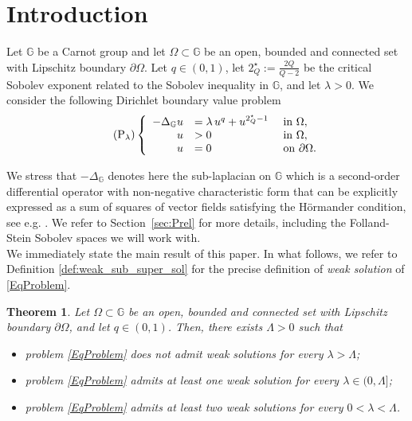 \documentclass[11pt]{amsart}
\numberwithin{equation}{section} %
\newtheorem{teo}{Theorem}[section]
\theoremstyle{definition}
\begin{document}
 	
\maketitle

\section{Introduction}
Let $\mathbb{G}$ be a Carnot group and let $\Omega \subset \mathbb{G}$ be an open, bounded and connected set with Lipschitz boundary $\partial \Omega$. Let $q \in (0,1)$, let $2^{\star}_{Q}:=\tfrac{2Q}{Q-2}$ be the critical Sobolev exponent related to the Sobolev inequality in $\mathbb{G}$, and let $\lambda >0$. We consider the following Dirichlet boundary value problem
\begin{equation}\tag{{$\mathrm{P}_{\lambda}$}}\label{EqProblem}
	\left\{\begin{array}{rll}
		-\Delta_{\mathbb{G}}u& = \lambda\, u^{q} + u^{2^{\star}_{Q}-1} & \textrm{ in } \Omega,\\
		u&>0 & \textrm{ in } \Omega,\\
		u&=0 & \textrm{ on } \partial \Omega.
	\end{array}\right.
\end{equation}

We stress that $-\Delta_{\mathbb{G}}$ denotes here the sub-laplacian on $\mathbb{G}$ which is a second-order differential operator with non-negative characteristic form that can be explicitly expressed as a sum of squares of vector fields satisfying the H\"{o}rmander condition, see e.g. \cite{Hormander}. We refer to Section~\ref{sec:Prel} for more details, including the Folland-Stein Sobolev spaces we will work with.\\
%
We immediately state the main result of this paper. In what follows,
we refer to Definition \ref{def:weak_sub_super_sol} for the precise definition of \emph{weak solution}
of \eqref{EqProblem}.
\begin{teo} \label{thm:main}
	Let $\Omega\subset\mathbb{G}$ be an open, bounded and connected
	set
	with Lipschitz boundary $\partial \Omega$, and let $q\in (0,1)$. Then, there exists $\Lambda > 0$
	such that
	\begin{itemize}
		\item[A)]problem \eqref{EqProblem} does not admit weak solutions
		for every $\lambda>\Lambda$;
		\item[B)] problem \eqref{EqProblem} admits at least one weak solution for every $\lambda \in (0,\Lambda]$;
		\item[C)] problem \eqref{EqProblem} admits at least two weak solutions for every $0<\lambda<\Lambda$.
	\end{itemize}
\end{teo}
\end{document}
